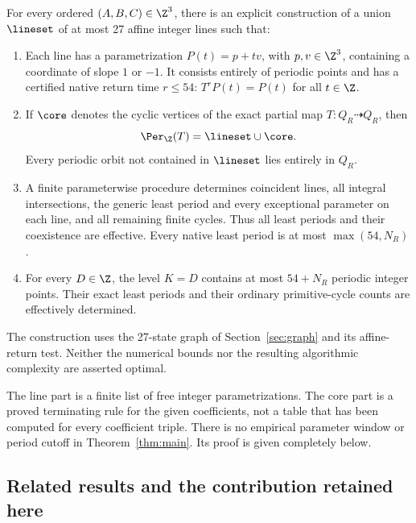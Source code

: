 \begin{theorem}
\label{thm:main}
For every ordered \((A,B,C)\in\Z^3\), there is an explicit construction
of a union \(\lineset\) of at most 27 affine integer lines such that:
\begin{enumerate}
 \item Each line has a parametrization \(P(t)=p+tv\), with
 \(p,v\in\Z^3\), containing a coordinate of slope \(1\) or \(-1\).
 It consists entirely of periodic points and has a certified native
 return time \(r\le54\): \(T^rP(t)=P(t)\) for all \(t\in\Z\).
 \item If \(\core\) denotes the cyclic vertices of the exact partial
 map \(T:Q_R\dashrightarrow Q_R\), then
 \begin{equation}\label{eq:exhaustive_union}
    \Per_\Z(T)=\lineset\cup\core.
 \end{equation}
 Every periodic orbit not contained in \(\lineset\) lies entirely in
 \(Q_R\).
 \item A finite parameterwise procedure determines coincident lines,
 all integral intersections, the generic least period and every
 exceptional parameter on each line, and all remaining finite cycles.
 Thus all least periods and their coexistence are effective. Every
 native least period is at most \(\max(54,N_R)\).
 \item For every \(D\in\Z\), the level \(K=D\) contains at most
 \(54+N_R\) periodic integer points. Their exact least periods and
 their ordinary primitive-cycle counts are effectively determined.
\end{enumerate}
The construction uses the 27-state graph of Section~\ref{sec:graph}
and its affine-return test. Neither the numerical bounds nor the
resulting algorithmic complexity are asserted optimal.
\end{theorem}

The line part is a finite list of free integer parametrizations. The
core part is a proved terminating rule for the given coefficients, not
a table that has been computed for every coefficient triple. There is
no empirical parameter window or period cutoff in
Theorem~\ref{thm:main}. Its proof is given completely below.

\subsection{Related results and the contribution retained here}
\label{subsec:ownership}

